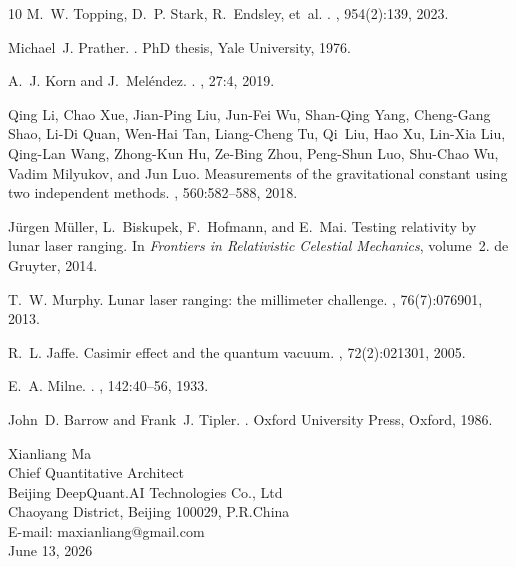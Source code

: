 \documentclass[12pt,leqno]{article}
\begin{document}
{\begin{thebibliography}{10}
		M.~W. Topping, D.~P. Stark, R.~Endsley, et~al.
		.
		, 954(2):139, 2023.
		
		Michael~J. Prather.
		.
		\newblock PhD thesis, Yale University, 1976.
		
		A.~J. Korn and J.~Meléndez.
		.
		, 27:4, 2019.
		
		Qing Li, Chao Xue, Jian-Ping Liu, Jun-Fei Wu, Shan-Qing Yang, Cheng-Gang Shao,
		Li-Di Quan, Wen-Hai Tan, Liang-Cheng Tu, Qi~Liu, Hao Xu, Lin-Xia Liu,
		Qing-Lan Wang, Zhong-Kun Hu, Ze-Bing Zhou, Peng-Shun Luo, Shu-Chao Wu, Vadim
		Milyukov, and Jun Luo.
		\newblock Measurements of the gravitational constant using two independent
		methods.
		, 560:582--588, 2018.
		
		Jürgen Müller, L.~Biskupek, F.~Hofmann, and E.~Mai.
		\newblock Testing relativity by lunar laser ranging.
		\newblock In {\em Frontiers in Relativistic Celestial Mechanics}, volume~2. de
		Gruyter, 2014.
		
		T.~W. Murphy.
		\newblock Lunar laser ranging: the millimeter challenge.
		, 76(7):076901, 2013.
		
		R.~L. Jaffe.
		\newblock Casimir effect and the quantum vacuum.
		, 72(2):021301, 2005.
		
		E.~A. Milne.
		.
		,
		142:40--56, 1933.
		
		John~D. Barrow and Frank~J. Tipler.
		.
		\newblock Oxford University Press, Oxford, 1986.
		
	\end{thebibliography}
	
		
	\newpage
	
	
	
	\vskip 0.6in
	\noindent
	Xianliang Ma\\[10pt]
	Chief Quantitative Architect\\[2pt]
	Beijing DeepQuant.AI Technologies Co., Ltd\\[2pt]
	Chaoyang District, Beijing 100029, P.R.China\\[10pt]
	E-mail: maxianliang@gmail.com\\[10pt]
	June 13, 2026
	
}
\end{document}
